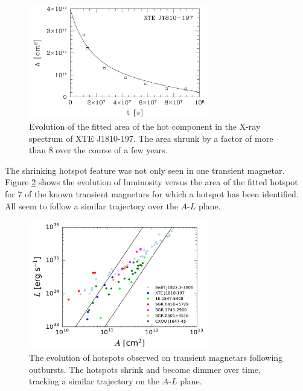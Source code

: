 \begin{figure}[h]
  \centering
  \includegraphics[width=0.7\textwidth]{pics/intro/shrink-spot.png}
  \caption[Evolution of the fitted area of the hot component in the X-ray
    spectrum of XTE J1810-197.]{Evolution of the fitted area of the hot component in the X-ray
    spectrum of XTE J1810-197. The area shrunk by a factor of more than 8 over
    the course of a few years.}
  \label{fig:shrinking-hotspot}
\end{figure}

The shrinking hotspot feature was not only seen in one transient magnetar.
Figure \ref{fig:hotspots} shows the evolution of luminosity versus the area of
the fitted hotspot for 7 of the known transient magnetars for which a hotspot
has been identified. All seem to follow a similar trajectory over the $A$-$L$ plane.

\begin{figure}[h]
  \centering
  \includegraphics[width=0.7\textwidth]{pics/intro/hot-spot.png}
  \caption[The evolution of hotspots observed on transient magnetars following
    outbursts.]{The evolution of hotspots observed on transient magnetars following
    outbursts. The hotspots shrink and become dimmer over time, tracking a
    similar trajectory on the $A$-$L$ plane. \citep{beloborodov_magnetar_2016}}
  \label{fig:hotspots}
\end{figure}

